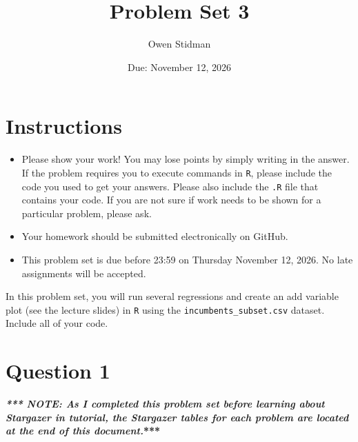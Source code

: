 \documentclass[12pt,letterpaper]{article}
\title{Problem Set 3}
\date{Due: November 12, 2026}
\author{Owen Stidman}
\begin{document}
	\maketitle
	\section*{Instructions}
	\begin{itemize}
		\item Please show your work! You may lose points by simply writing in the answer. If the problem requires you to execute commands in \texttt{R}, please include the code you used to get your answers. Please also include the \texttt{.R} file that contains your code. If you are not sure if work needs to be shown for a particular problem, please ask.
	\item Your homework should be submitted electronically on GitHub.
	\item This problem set is due before 23:59 on Thursday November 12, 2026. No late assignments will be accepted.

	\end{itemize}

		\vspace{.25cm}
	
\noindent In this problem set, you will run several regressions and create an add variable plot (see the lecture slides) in \texttt{R} using the \texttt{incumbents\_subset.csv} dataset. Include all of your code.

	\vspace{.5cm}
\section*{Question 1}
\vspace{.25cm}

\textbf{\textit{*** NOTE: As I completed this problem set before learning about Stargazer in tutorial, the Stargazer tables for each problem are located at the end of this document.}***}

\vspace{.25cm}
\end{document}
